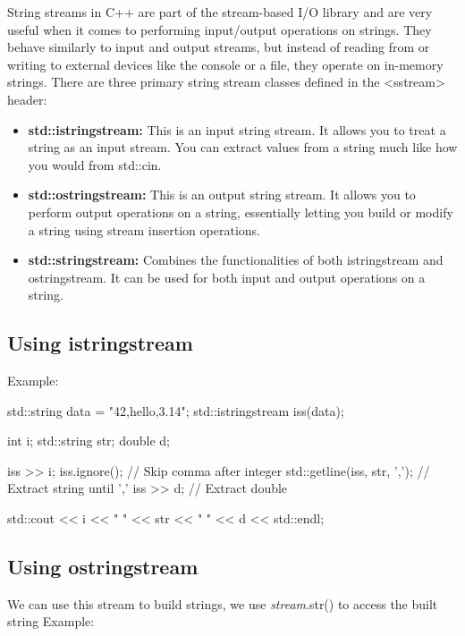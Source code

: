 \documentclass{report}
\begin{document}
    \pagebreak
    \bigbreak \noindent 
     String streams in C++ are part of the stream-based I/O library and are very useful when it comes to performing input/output operations on strings. They behave similarly to input and output streams, but instead of reading from or writing to external devices like the console or a file, they operate on in-memory strings.
     \bigbreak \noindent 
     There are three primary string stream classes defined in the <sstream> header:
     \begin{itemize}
         \item \textbf{std::istringstream:} This is an input string stream. It allows you to treat a string as an input stream. You can extract values from a string much like how you would from std::cin.
         \item \textbf{std::ostringstream:} This is an output string stream. It allows you to perform output operations on a string, essentially letting you build or modify a string using stream insertion operations.
         \item \textbf{std::stringstream:} Combines the functionalities of both istringstream and ostringstream. It can be used for both input and output operations on a string.
     \end{itemize}

     \bigbreak \noindent 
     \subsection{Using istringstream}
     \bigbreak \noindent 
     Example:
     \bigbreak \noindent 
     
     \begin{cppcode}
std::string data = "42,hello,3.14";
std::istringstream iss(data);

int i;
std::string str;
double d;

iss >> i;
iss.ignore(); // Skip comma after integer
std::getline(iss, str, ','); // Extract string until ','
iss >> d;                    // Extract double

std::cout << i << " " << str << " " << d << std::endl;
     \end{cppcode}
     

     \bigbreak \noindent 
     \subsection{Using ostringstream}
     \bigbreak \noindent 
     We can use this stream to build strings, we use \textit{stream}.str() to access the built string
     \bigbreak \noindent 
     Example:
     \bigbreak \noindent 
     
\end{document}
